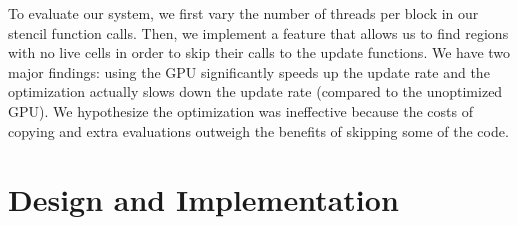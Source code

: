 \documentclass[onecolumn,12pt]{IEEEtran}
\begin{document}
  To evaluate our system, we first vary the number of threads per block in our
  stencil function calls. Then, we implement a feature that allows us to find
  regions with no live cells in order to skip their calls to the update
  functions.  We have two major findings: using the GPU significantly speeds up
  the update rate and the optimization actually slows down the update rate
  (compared to the unoptimized GPU). We hypothesize the optimization was
  ineffective because the costs of copying and extra evaluations outweigh the
  benefits of skipping some of the code.

  \section{Design and Implementation}
\end{document}
